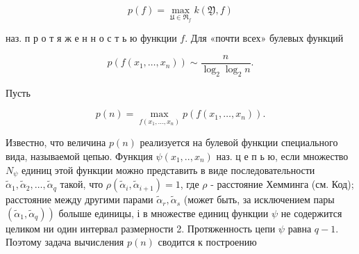 \documentclass[10pt]{article}
\begin{document}
\[

p(f)=\max _{\mathfrak{U} \in \mathfrak{R}_{f}} k(\mathfrak{Y}, f)

\]



наз. п р о т я ж е н н о с т ь ю функции $f$. Для «почти всех» булевых функций



\[

p\left(f\left(x_{1}, \ldots, x_{n}\right)\right) \sim \frac{n}{\log _{2} \log _{2} n} .

\]



Пусть



\[

p(n)=\max _{f\left(x_{1}, \ldots, x_{n}\right)} p\left(f\left(x_{1}, \ldots, x_{n}\right)\right) .

\]



Известно, что величина $p(n)$ реализуется на булевой функции специального вида, называемой цепью. Функция $\psi\left(x_{1}, . ., x_{n}\right)$ наз. ц е п ь ю, если множество $N_{\psi}$ единиц этой функции можно представить в виде последовательности $\tilde{\alpha}_{1}, \tilde{\alpha}_{2}, \ldots, \tilde{\alpha}_{q}$ такой, что $\rho\left(\tilde{\alpha}_{i}, \tilde{\alpha}_{i+1}\right)=1$, где $\rho$ - расстояние Хемминга (см. Код); расстояние между другими парами $\tilde{\alpha}_{r}, \tilde{\alpha}_{s}$ (может быть, за исключением пары $\left.\left(\tilde{\alpha}_{1}, \tilde{\alpha}_{q}\right)\right)$ болыше единицы, і в множестве единиц функции $\psi$ не содержится целиком ни один интервал размерности 2. Протяженность цепи $\psi$ равна $q-1$. Поэтому задача вычисления $p(n)$ сводится к построению
\end{document}
